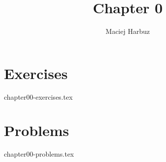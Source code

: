 \documentclass[12pt, a4paper]{article}
\title{Chapter 0}
\author{Maciej Harbuz}
\begin{document}
\maketitle

\section{Exercises}
%
{chapter00-exercises.tex}

\section{Problems}
%
{chapter00-problems.tex}
\end{document}
